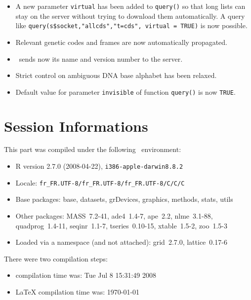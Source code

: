 \documentclass{article}
\begin{document}
\begin{itemize}
\item A new parameter \texttt{virtual} has been added to \texttt{query()} 
so that long lists can stay on the server without trying to download
them automatically. A query like \texttt{query(s\$socket,"allcds","t=cds", virtual = TRUE)} is 
now possible.

\item Relevant genetic codes and frames are now automatically propagated.

\item \Seqinr{}~sends now its name and version number to the server.

\item Strict control on ambiguous DNA base alphabet has been relaxed.

\item Default value for parameter \texttt{invisible} of function \texttt{query()} is now \texttt{TRUE}.

\end{itemize}



\section*{Session Informations}

This part was compiled under the following \Rlogo{}~environment:

\begin{itemize}
  \item R version 2.7.0 (2008-04-22), \verb|i386-apple-darwin8.8.2|
  \item Locale: \verb|fr_FR.UTF-8/fr_FR.UTF-8/fr_FR.UTF-8/C/C/C|
  \item Base packages: base, datasets, grDevices, graphics, methods,
    stats, utils
  \item Other packages: MASS~7.2-41, ade4~1.4-7, ape~2.2,
    nlme~3.1-88, quadprog~1.4-11, seqinr~1.1-7, tseries~0.10-15,
    xtable~1.5-2, zoo~1.5-3
  \item Loaded via a namespace (and not attached): grid~2.7.0,
    lattice~0.17-6
\end{itemize}
There were two compilation steps:

\begin{itemize}
  \item \Rlogo{} compilation time was: Tue Jul  8 15:31:49 2008
  \item \LaTeX{} compilation time was: \today
\end{itemize}



\clearpage
{}


\end{document}
